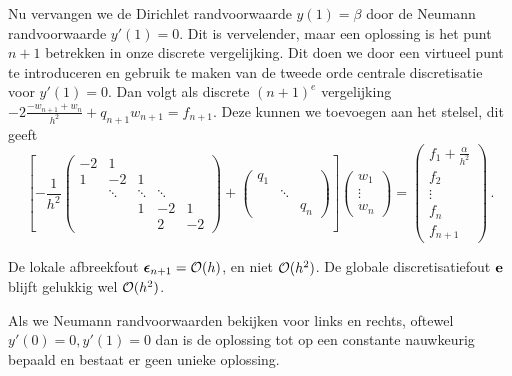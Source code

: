 \documentclass{2wn20summary}
\begin{document}
			Nu vervangen we de Dirichlet randvoorwaarde $y(1)=\beta$ door de Neumann randvoorwaarde $y'(1)=0$. Dit is vervelender, maar een oplossing is het punt $n+1$ betrekken in onze discrete vergelijking. Dit doen we door een virtueel punt te introduceren en gebruik te maken van de tweede orde centrale discretisatie voor $ y'(1)=0 $. Dan volgt als discrete $ (n+1)^e $ vergelijking $ -2\frac{-w_{n+1}+w_n}{h^2} + q_{n+1}w_{n+1} = f_{n+1} $. Deze kunnen we toevoegen aan het stelsel, dit geeft
			\[ 
				\left[ -\frac{1}{h^2} \begin{pmatrix}
				-2 & 1 & & &\\
				1 & -2 & 1 & & \\
				& \ddots & \ddots & \ddots & \\
				& & 1 & -2 & 1 \\
				& & & 2 & -2  
				\end{pmatrix} + \begin{pmatrix}
				q_1 & & \\
				& \ddots & \\
				& & q_n
				\end{pmatrix} \right] \begin{pmatrix}
				w _1 \\
				\vdots \\
				w_n
				\end{pmatrix} = \begin{pmatrix}
				f_1 + \frac{\alpha}{h^2} \\
				f_2 \\
				\vdots \\
				f_n \\
				f_{n+1}
				\end{pmatrix}\,.
			\]
			\begin{opm}
				De lokale afbreekfout $ \bep_{n+1} = \bigO(h) $, en niet $ \mathcal{O}(h^2) $. De globale discretisatiefout $ {\textbf{e}} $ blijft gelukkig wel $ \mathcal{O}(h^2) $.
			\end{opm}
			\begin{opm}
				Als we Neumann randvoorwaarden bekijken voor links en rechts, oftewel $ y'(0) = 0, y'(1) = 0 $ dan is de oplossing tot op een constante nauwkeurig bepaald en bestaat er geen unieke oplossing.
			\end{opm}
			
\end{document}
